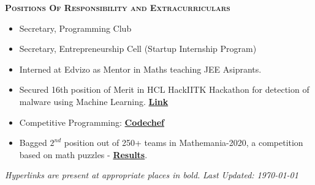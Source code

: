 \documentclass{article}
\begin{document}
\noindent\colorbox{shadecolor}
{\parbox{\dimexpr\textwidth-2\fboxsep\relax}{\textsc{\textbf{Positions Of Responsibility and Extracurriculars}}}}
\vspace*{-7mm}
\begin{multicols}{2}
\begin{itemize}[topsep=5pt,itemsep=2pt, partopsep =2pt, parsep =2pt]
    \item Secretary, Programming Club
    \item Secretary, Entrepreneurship Cell (Startup Internship Program) 
    \item Interned at Edvizo as Mentor in Maths teaching JEE Asiprants.
    \item Secured 16th position of Merit in HCL HackIITK Hackathon for detection of malware using Machine Learning. \textbf{\href{https://github.com/SarthakRout/HCL-HackIITK-Hackathon}{Link}}
    \item Competitive Programming: \textbf{\href{https://www.codechef.com/users/sarthakrout}{Codechef}}
    \item Bagged $2^{nd}$ position out of 250+ teams in Mathemania-2020, a competition based on math puzzles - \href{https://stamatics.github.io/mathemania/results}{\textbf{Results}}. 
\end{itemize}
\end{multicols}

\vspace*{\fill}
\noindent
 \textit{Hyperlinks are present at appropriate places in bold. } \hfill
 \textit{  Last Updated: \today }
\end{document}
